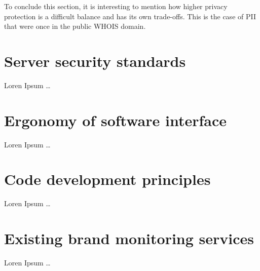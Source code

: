 To conclude this section, it is interesting to mention how higher privacy
protection is a difficult balance and has its own trade-offs. This is the case
of PII that were once in the public WHOIS domain.

\section{Server security standards}
Loren Ipsum \ldots

\section{Ergonomy of software interface}
Loren Ipsum \ldots

\section{Code development principles}
Loren Ipsum \ldots

\section{Existing brand monitoring services}
Loren Ipsum \ldots
